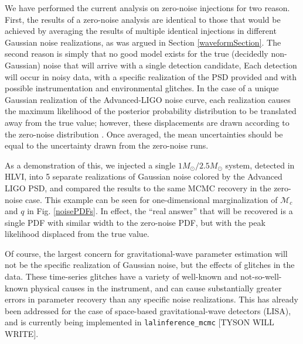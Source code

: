 \documentclass[11pt,a4paper]{emulateapj}
\newcommand{\carl}[1]{{\color{red}  #1}}
\newcommand{\chmass}{\mathcal{M}_c}
\begin{document}
  

We have performed the current analysis on zero-noise injections for two reason.  First, the results of a zero-noise 
analysis are identical to those that would be achieved by averaging the results of multiple identical injections 
in different Gaussian noise realizations, as was argued in Section \ref{waveformSection}.  The second reason is simply
that no good model exists for the true (decidedly non-Gaussian) noise that will arrive with a single detection candidate,
Each detection will occur in noisy data, with a specific realization of the PSD provided and with 
possible instrumentation and environmental glitches.  In the case of a unique Gaussian realization
of the Advanced-LIGO noise curve, each realization causes the maximum likelihood of the posterior probability 
distribution to be translated away from the true value; however, these displacements are drawn
according to the zero-noise distribution \citep{Inadequacies}.  Once averaged, the mean
uncertainties should be equal to the uncertainty drawn from the zero-noise runs.  

As a demonstration of this, we injected a single $1M_{\odot}/2.5M_{\odot}$ system, 
detected in HLVI,  into 5 separate realizations of Gaussian noise colored by the Advanced LIGO PSD, 
and compared the results to the same MCMC recovery in the zero-noise case.  This example
can be seen for one-dimensional marginalization of $\chmass$ and $q$ in Fig. \ref{noisePDFs}.  In effect, the ``real answer'' that will be recovered is a single PDF with similar 
width to the zero-noise PDF, but with the peak likelihood displaced from the true value.  

Of course, the largest concern for gravitational-wave parameter estimation will not be the specific
realization of Gaussian noise, but the effects of glitches in the data.  These time-series 
glitches have a variety of well-known and not-so-well-known physical causes in the instrument,
and can cause substantially greater errors in parameter recovery than any specific noise realizations.  This has already been addressed for the case of space-based gravitational-wave
detectors (LISA), and is currently being implemented in \texttt{lalinference\_mcmc} 
\carl{[TYSON WILL WRITE]}.
\end{document}
